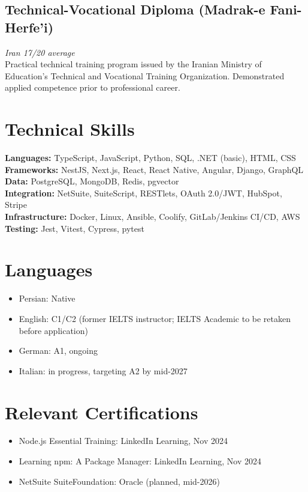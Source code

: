 \documentclass[a4paper,10pt]{article}
\begin{document}
\subsection{Technical-Vocational Diploma (Madrak-e Fani-Herfe'i)}
\emph{Iran \textbar{} 17/20 average}\\
Practical technical training program issued by the Iranian Ministry of Education's Technical and Vocational Training Organization. Demonstrated applied competence prior to professional career.

\section{Technical Skills}

\textbf{Languages:} TypeScript, JavaScript, Python, SQL, .NET (basic), HTML, CSS\\
\textbf{Frameworks:} NestJS, Next.js, React, React Native, Angular, Django, GraphQL\\
\textbf{Data:} PostgreSQL, MongoDB, Redis, pgvector\\
\textbf{Integration:} NetSuite, SuiteScript, RESTlets, OAuth 2.0/JWT, HubSpot, Stripe\\
\textbf{Infrastructure:} Docker, Linux, Ansible, Coolify, GitLab/Jenkins CI/CD, AWS\\
\textbf{Testing:} Jest, Vitest, Cypress, pytest

\section{Languages}

\begin{itemize}[leftmargin=14pt,itemsep=2pt]
  \item Persian: Native
  \item English: C1/C2 (former IELTS instructor; IELTS Academic to be retaken before application)
  \item German: A1, ongoing
  \item Italian: in progress, targeting A2 by mid-2027
\end{itemize}

\section{Relevant Certifications}

\begin{itemize}[leftmargin=14pt,itemsep=2pt]
  \item Node.js Essential Training: LinkedIn Learning, Nov 2024
  \item Learning npm: A Package Manager: LinkedIn Learning, Nov 2024
  \item NetSuite SuiteFoundation: Oracle (planned, mid-2026)
\end{itemize}
\end{document}
